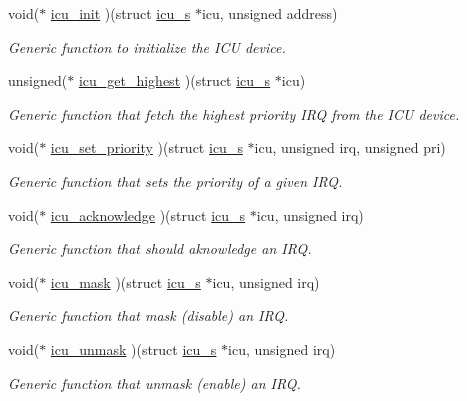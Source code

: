 \begin{DoxyCompactItemize}
\item 
void($\ast$ \hyperlink{structicu__ops__s_acfb85f348f0664db040ecc73ebbd5cc7}{icu\-\_\-init} )(struct \hyperlink{structicu__s}{icu\-\_\-s} $\ast$icu, unsigned address)
\begin{DoxyCompactList}\small\item\em Generic function to initialize the I\-C\-U device. \end{DoxyCompactList}\item 
unsigned($\ast$ \hyperlink{structicu__ops__s_a7aa5d37f9a8ef9f3e59211ff5ab213c0}{icu\-\_\-get\-\_\-highest} )(struct \hyperlink{structicu__s}{icu\-\_\-s} $\ast$icu)
\begin{DoxyCompactList}\small\item\em Generic function that fetch the highest priority I\-R\-Q from the I\-C\-U device. \end{DoxyCompactList}\item 
void($\ast$ \hyperlink{structicu__ops__s_a1f08d353530f63d1877f160fd70fcdfd}{icu\-\_\-set\-\_\-priority} )(struct \hyperlink{structicu__s}{icu\-\_\-s} $\ast$icu, unsigned irq, unsigned pri)
\begin{DoxyCompactList}\small\item\em Generic function that sets the priority of a given I\-R\-Q. \end{DoxyCompactList}\item 
void($\ast$ \hyperlink{structicu__ops__s_aec94869f891ee17f4743f46da01dcced}{icu\-\_\-acknowledge} )(struct \hyperlink{structicu__s}{icu\-\_\-s} $\ast$icu, unsigned irq)
\begin{DoxyCompactList}\small\item\em Generic function that should aknowledge an I\-R\-Q. \end{DoxyCompactList}\item 
void($\ast$ \hyperlink{structicu__ops__s_af63b387a2985011e4e430d568d3f0b04}{icu\-\_\-mask} )(struct \hyperlink{structicu__s}{icu\-\_\-s} $\ast$icu, unsigned irq)
\begin{DoxyCompactList}\small\item\em Generic function that mask (disable) an I\-R\-Q. \end{DoxyCompactList}\item 
void($\ast$ \hyperlink{structicu__ops__s_a4aee28cc809733a67481e782c1efd1fa}{icu\-\_\-unmask} )(struct \hyperlink{structicu__s}{icu\-\_\-s} $\ast$icu, unsigned irq)
\begin{DoxyCompactList}\small\item\em Generic function that unmask (enable) an I\-R\-Q. \end{DoxyCompactList}\end{DoxyCompactItemize}


